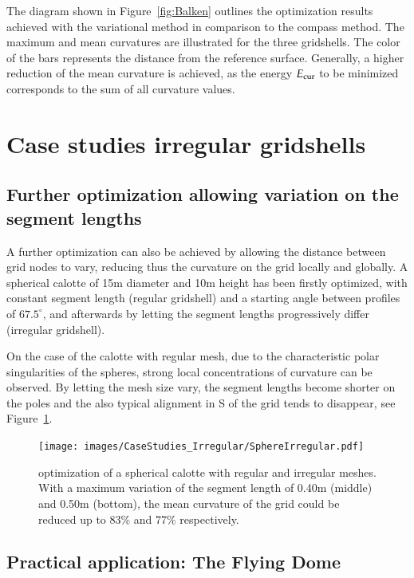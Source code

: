 \documentclass[Thesis.tex]{subfiles}
\begin{document}
The diagram shown in Figure~\ref{fig:Balken} outlines the optimization results achieved with the variational method in comparison to the compass method. The maximum and mean curvatures are illustrated for the three gridshells. The color of the bars represents the distance from the reference surface. Generally, a higher reduction of the mean curvature is achieved, as the energy $E_{\textrm{\scriptsize{cur}}}$ to be minimized corresponds to the sum of all curvature values.

\section{Case studies irregular gridshells}

\subsection{Further optimization allowing variation on the segment lengths}

A further optimization can also be achieved by allowing the distance between grid nodes to vary, reducing thus the curvature on the grid locally and globally. A spherical calotte of 15m diameter and 10m height has been firstly optimized, with constant segment length (regular gridshell) and a starting angle between profiles of $67.5^\circ$, and afterwards  by letting the segment lengths progressively differ (irregular gridshell). 

On the case of the calotte with regular mesh, due to the characteristic polar singularities of the spheres, strong local concentrations of curvature can be observed. By letting the mesh size vary, the segment lengths become shorter on the poles and the also typical alignment in S of the grid tends to disappear, see Figure~\ref{fig:SphereIrregular}.

\begin{figure}
\centering
\texttt{[image: images/CaseStudies\_Irregular/SphereIrregular.pdf]}
\caption{optimization of a spherical calotte with regular and irregular meshes. With a maximum variation of the segment length of 0.40m (middle) and 0.50m (bottom), the mean curvature of the grid could be reduced up to 83\% and 77\% respectively.}
\label{fig:SphereIrregular}
\end{figure}

\subsection{Practical application: The Flying Dome}
\end{document}
